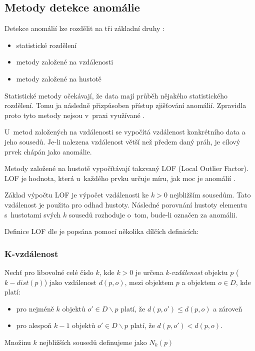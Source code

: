 \documentclass[thesis=M,czech]{FITthesis}[2012/10/20]
\begin{document}
		\subsection{Metody detekce anomálie}
			Detekce anomálií lze rozdělit na tři základní druhy \cite{KumarPCAANom}: 
			\begin{itemize} 
				\item statistické rozdělení
				\item metody založené na vzdálenosti 
				\item metody založené na hustotě		
			\end{itemize}
		
			Statistické metody očekávají, že data mají průběh nějakého statistického rozdělení. Tomu ja následně přizpůsoben přístup zjišťování anomálií. Zpravidla proto tyto metody nejsou v~praxi využívané \cite{KumarPCAANom}.
			
			U~metod založených na vzdálenosti se vypočítá vzdálenost konkrétního data a jeho sousedů. Je-li nalezena vzdálenost větší než předem daný práh, je cílový prvek chápán jako anomálie.
			
			Metody založené na hustotě vypočítávají takzvaný LOF (Local Outlier Factor). LOF je hodnota, která u~každého prvku určuje míru, jak moc je anomálií \cite{LOF}.
			
			Základ výpočtu LOF je výpočet vzdálenosti ke $k > 0$ nejbližším sousedům. Tato vzdálenost je použita pro odhad hustoty. Následné porovnání hustoty elementu s~hustotami svých $k$ sousedů rozhoduje o~tom, bude-li označen za anomálii.
			
			Definice LOF dle \cite{LOF} je popsána pomocí několika dílčích definicích: 
			
			\subsubsection{K-vzdálenost}
				Nechť pro libovolné celé číslo $k$, kde $k > 0$ je určena \textit{k-vzdálenost} objektu $p$ ($k-dist(p)$) jako vzdálenost $d(p, o)$, mezi objektem $p$ a objektem $o \in D$, kde platí:
			
				\begin{itemize} 
					\item pro nejméně $k$ objektů $o' \in D \backslash {p}$	platí, že $d(p, o') \leq d(p, o)$ a zároveň
					\item pro alespoň $k-1$ objektů $o' \in D \backslash {p}$ platí, že $d(p, o') < d(p, o)$.
				\end{itemize}
				Množinu $k$ nejbližších sousedů definujeme jako $N_k(p)$
		
\end{document}
